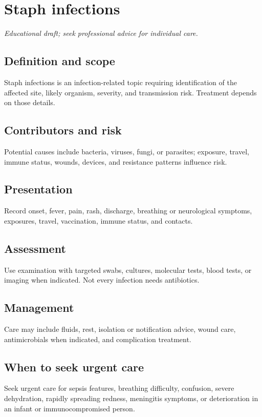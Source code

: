 \chapter{Staph infections}
\medskip
\noindent\textit{Educational draft; seek professional advice for individual care.}

\section*{Definition and scope}
Staph infections is an infection-related topic requiring identification of the affected site, likely organism, severity, and transmission risk. Treatment depends on those details.

\section*{Contributors and risk}
Potential causes include bacteria, viruses, fungi, or parasites; exposure, travel, immune status, wounds, devices, and resistance patterns influence risk.

\section*{Presentation}
Record onset, fever, pain, rash, discharge, breathing or neurological symptoms, exposures, travel, vaccination, immune status, and contacts.

\section*{Assessment}
Use examination with targeted swabs, cultures, molecular tests, blood tests, or imaging when indicated. Not every infection needs antibiotics.

\section*{Management}
Care may include fluids, rest, isolation or notification advice, wound care, antimicrobials when indicated, and complication treatment.

\section*{When to seek urgent care}
Seek urgent care for sepsis features, breathing difficulty, confusion, severe dehydration, rapidly spreading redness, meningitis symptoms, or deterioration in an infant or immunocompromised person.

